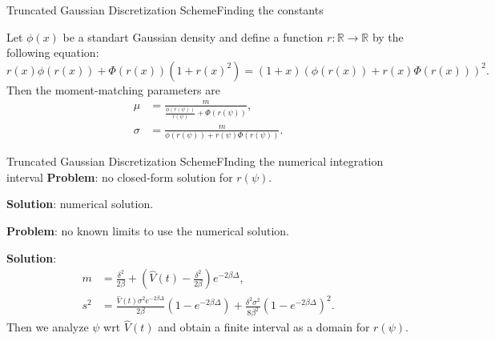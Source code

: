     \begin{frame}{Truncated Gaussian Discretization Scheme}{Finding the constants}
        \begin{proposition}
            Let $\phi(x)$ be a standart Gaussian density and define a function $r:\mathbb{R} \to \mathbb{R}$ by the following equation:
            \begin{equation}
                r(x)\phi(r(x))+\Phi(r(x))(1+r(x)^2)= (1+x)\left(\phi(r(x)) + r(x)\Phi(r(x))\right)^2.
            \end{equation}
            Then the moment-matching parameters are
            \begin{align}
                \mu &= \frac{m}{\frac{\phi(r(\psi))}{r(\psi)} + \Phi(r(\psi))},\\ 
                \sigma &= \frac{m}{\phi(r(\psi)) + r(\psi)\Phi(r(\psi))}.
            \end{align}
        \end{proposition}
    \end{frame}

    \begin{frame}{Truncated Gaussian Discretization Scheme}{FInding the numerical integration interval}
        \textbf{Problem}: no closed-form solution for $r(\psi)$. 
        
        \textbf{Solution}: numerical solution.

        \textbf{Problem}: no known limits to use the numerical solution.

        \textbf{Solution}: 
        \begin{align}
            m   &= \frac{\delta^2}{2\beta} + \left(\hat{V}(t) - \frac{\delta^2}{2\beta}\right)e^{-2\beta \Delta},\\
            s^2 &= \frac{\hat{V}(t)\sigma^2e^{-2\beta \Delta}}{2\beta}\left(1 - e^{-2\beta \Delta}\right) + \frac{\delta^2\sigma^2}{8\beta^2}\left(1 - e^{-2\beta \Delta}\right)^2.
        \end{align}
        Then we analyze $\psi$ wrt $\hat{V}(t)$ and obtain a finite interval as a domain for $r(\psi)$.
    \end{frame}